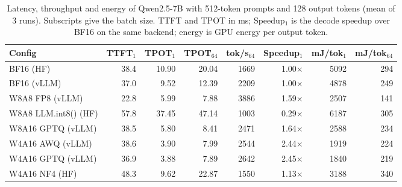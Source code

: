 \begin{table}[htbp]
\centering
\footnotesize
\caption{Latency, throughput and energy of Qwen2.5-7B with 512-token prompts and 128 output tokens (mean of 3 runs). Subscripts give the batch size. TTFT and TPOT in ms; Speedup$_1$ is the decode speedup over BF16 on the same backend; energy is GPU energy per output token.}
\label{tab:speed}
\setlength{\tabcolsep}{4pt}
\begin{tabular}{lrrrrrrr}
\toprule
Config & TTFT$_{1}$ & TPOT$_{1}$ & TPOT$_{64}$ & tok/s$_{64}$ & Speedup$_{1}$ & mJ/tok$_{1}$ & mJ/tok$_{64}$ \\
\midrule
BF16 (HF) & 38.4 & 10.90 & 20.04 & 1669 & 1.00$\times$ & 5092 & 294 \\
BF16 (vLLM) & 37.0 & 9.52 & 12.39 & 2209 & 1.00$\times$ & 4878 & 249 \\
W8A8 FP8 (vLLM) & 22.8 & 5.99 & 7.88 & 3886 & 1.59$\times$ & 2507 & 141 \\
W8A8 LLM.int8() (HF) & 57.8 & 37.45 & 47.14 & 1003 & 0.29$\times$ & 6187 & 305 \\
W8A16 GPTQ (vLLM) & 38.5 & 5.80 & 8.41 & 2471 & 1.64$\times$ & 2588 & 234 \\
W4A16 AWQ (vLLM) & 38.6 & 3.90 & 7.99 & 2544 & 2.44$\times$ & 1919 & 224 \\
W4A16 GPTQ (vLLM) & 36.9 & 3.88 & 7.89 & 2642 & 2.45$\times$ & 1840 & 219 \\
W4A16 NF4 (HF) & 48.3 & 9.62 & 22.87 & 1550 & 1.13$\times$ & 3188 & 340 \\
\bottomrule
\end{tabular}
\end{table}
